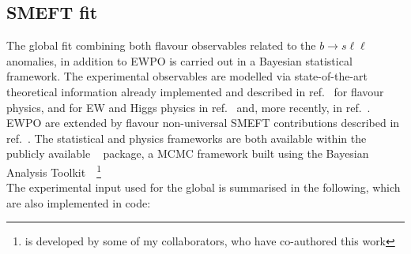 \subsection{SMEFT fit}
\label{sec:strategy}
The global fit combining both flavour observables related to the $ b \to s \ell \ell$ anomalies, in addition to EWPO is carried out in a Bayesian statistical framework. The experimental observables are modelled via state-of-the-art theoretical information already implemented and described in ref.~\cite{Ciuchini:2019usw} for flavour physics, and for EW and Higgs physics in ref.~\cite{Ciuchini:2013pca} and, more recently, in ref.~\cite{deBlas:2016ojx}. EWPO are extended by flavour non-universal  SMEFT contributions described in ref.~\cite{Efrati:2015eaa,deBlas:2019wgy}. The statistical and physics frameworks are both available within the publicly available \HEPfit~\cite{deBlas:2019okz} package,  a MCMC framework built using the Bayesian Analysis Toolkit~\cite{2009CoPhC.180.2197C}~\footnote{ \HEPfit is developed by some of my collaborators, who have co-authored this work}\\
The experimental input used for the global is summarised in the following, which are also implemented in \HEPfit code: 
